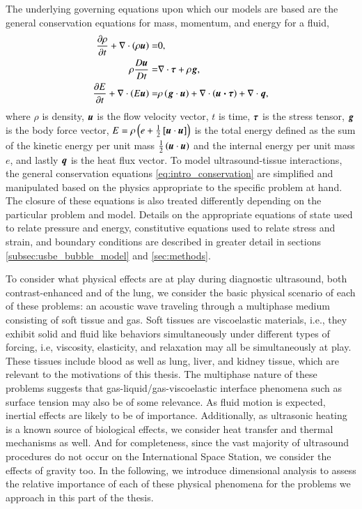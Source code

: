 The underlying governing equations upon which our models are based are
the general conservation equations for mass, momentum, and energy for
a fluid,
\begin{subequations} \label{eq:intro_conservation}             
  \begin{align}
    \frac{\partial \rho}{\partial t} + \nabla\cdot\left(\rho\bs{u}\right) =& 0,\\%
    \rho\frac{D \bs{u}}{D t} =& \nabla\cdot\bs{\tau}+\rho\bs{g},\\%
    \frac{\partial E}{\partial t} + \nabla\cdot\left(E \bs{u}\right) =& \rho\left(\bs{g}\cdot\bs{u}\right) + \nabla\cdot\left(\bs{u \cdot \tau}\right) + \nabla\cdot\bs{q},%
  \end{align}
\end{subequations}
where $\rho$ is density, $\boldsymbol{u}$ is the flow velocity vector, $t$ is
time, $\boldsymbol{\tau}$ is the stress tensor, $\boldsymbol{g}$ is the body force vector,
$E = \rho \left(e + \frac{1}{2}\left[\boldsymbol{u}\cdot\boldsymbol{u}\right]\right)$
is the total energy defined as the sum of the kinetic energy per unit
mass $\frac{1}{2}\left(\boldsymbol{u}\cdot\boldsymbol{u}\right)$ and the internal
energy per unit mass $e$, and lastly $\boldsymbol{q}$ is the heat flux
vector. To model ultrasound-tissue interactions, the general
conservation equations \eqref{eq:intro_conservation} are simplified
and manipulated based on the physics appropriate to the specific
problem at hand. The closure of these equations is also treated
differently depending on the particular problem and model. Details on
the appropriate equations of state used to relate pressure and energy,
constitutive equations used to relate stress and strain, and boundary
conditions are described in greater detail in sections
\ref{subsec:usbe_bubble_model} and \ref{sec:methods}.

To consider what physical effects are at play during diagnostic
ultrasound, both contrast-enhanced and of the lung, we consider the
basic physical scenario of each of these problems: an acoustic wave
traveling through a multiphase medium consisting of soft tissue and
gas. Soft tissues are viscoelastic materials, i.e., they exhibit solid
and fluid like behaviors simultaneously under different types of
forcing, i.e, viscosity, elasticity, and relaxation may all be
simultaneously at play. These tissues include blood as well as lung,
liver, and kidney tissue, which are relevant to the motivations of
this thesis. The multiphase nature of these problems suggests that
gas-liquid/gas-viscoelastic interface phenomena such as surface
tension may also be of some relevance. As fluid motion is expected,
inertial effects are likely to be of importance. Additionally, as
ultrasonic heating is a known source of biological effects, we
consider heat transfer and thermal mechanisms as well. And for
completeness, since the vast majority of ultrasound procedures do not
occur on the International Space Station, we consider the effects of
gravity too. In the following, we introduce dimensional analysis to
assess the relative importance of each of these physical phenomena for
the problems we approach in this part of the thesis.

